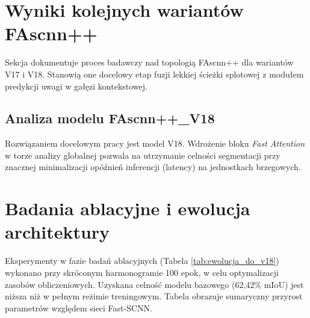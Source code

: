 \section{Wyniki kolejnych wariantów FAscnn++}
Sekcja dokumentuje proces badawczy nad topologią FAscnn++ dla wariantów V17 i V18. Stanowią one docelowy etap fuzji lekkiej ścieżki splotowej z modułem predykcji uwagi w gałęzi kontekstowej.

\subsection{Analiza modelu FAscnn++\_V18}
Rozwiązaniem docelowym pracy jest model V18. Wdrożenie bloku \textit{Fast Attention} w torze analizy globalnej pozwala na utrzymanie celności segmentacji przy znacznej minimalizacji opóźnień inferencji (latency) na jednostkach brzegowych.

\section{Badania ablacyjne i ewolucja architektury}
Eksperymenty w fazie badań ablacyjnych (Tabela \ref{tab:ewolucja_do_v18}) wykonano przy skróconym harmonogramie 100 epok, w celu optymalizacji zasobów obliczeniowych. Uzyskana celność modelu bazowego (62,42\% mIoU) jest niższa niż w pełnym reżimie treningowym. Tabela obrazuje sumaryczny przyrost parametrów względem sieci Fast-SCNN.

\begin{table}[htbp]
\centering
\caption{Ewolucja architektury sieci z wariantu Fast-SCNN do FAscnn++ V18 (rozdzielczość $1024 \times 2048$)}
\label{tab:ewolucja_do_v18}
\end{table}

